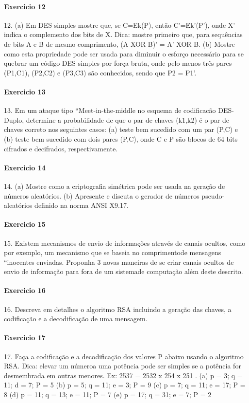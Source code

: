\documentclass[10pt,a4paper]{report}
\begin{document}
\paragraph{Exercicio 12}
12. (a) Em DES simples mostre que, se C=Ek(P), então C'=Ek'(P'), onde X' indica o complemento dos bits de X. Dica: mostre primeiro que, para sequências de bits A e B de mesmo comprimento, (A XOR B)' = A' XOR B.
(b) Mostre como esta propriedade pode ser usada para diminuir o esforço necessário para se quebrar um código DES simples por força bruta, onde pelo menos três pares (P1,C1), (P2,C2) e (P3,C3) são conhecidos, sendo que P2 = P1'.
\paragraph{Exercicio 13}
13. Em um ataque tipo ``Meet-in-the-middle no esquema de codificacão DES-Duplo, determine a probabilidade de que o par de chaves (k1,k2) é o par de chaves correto nos seguintes casos: (a) teste bem sucedido com um par (P,C) e (b) teste bem sucedido com dois pares (P,C), onde C e P são blocos de 64 bits cifrados e decifrados, respectivamente.
\paragraph{Exercicio 14}
14. (a) Mostre como a criptografia simétrica pode ser usada na geração de números aleatórios.
(b) Apresente e discuta o gerador de números pseudo-aleatórios definido na norma ANSI X9.17.
\paragraph{Exercicio 15}
15. Existem mecanismos de envio de informações através de canais ocultos, como por exemplo, um mecanismo que se baseia no comprimentode mensagens ``inocentes enviadas. Proponha 3 novas maneiras de se criar canais ocultos de envio de informação para fora de um sistemade computação além deste descrito.
\paragraph{Exercicio 16}
16. Descreva em detalhes o algoritmo RSA incluindo a geração das chaves, a codificação e a decodificação de uma mensagem.
\paragraph{Exercicio 17}
17. Faça a codificação e a decodificação dos valores P abaixo usando o algoritmo RSA. Dica: elevar um númeroa uma potência pode ser simples se a potência for desmembrada em outras menores. Ex: 2537 = 2532 x 254 x 251 .
(a) p = 3; q = 11; d = 7; P = 5
(b) p = 5; q = 11; e = 3; P = 9
(c) p = 7; q = 11; e = 17; P = 8
(d) p = 11; q = 13; e = 11; P = 7
(e) p = 17; q = 31; e = 7; P = 2
\end{document}
